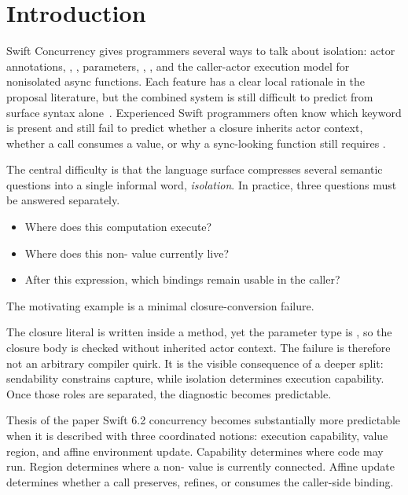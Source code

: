 \section{Introduction}
\label{sec:introduction}

Swift Concurrency gives programmers several ways to talk about isolation: actor annotations, , ,  parameters, , , and the caller-actor execution model for nonisolated async functions. Each feature has a clear local rationale in the proposal literature, but the combined system is still difficult to predict from surface syntax alone~\cite{se0313,se0414,se0420,se0430,se0431,se0461}. Experienced Swift programmers often know which keyword is present and still fail to predict whether a closure inherits actor context, whether a call consumes a value, or why a sync-looking function still requires .

The central difficulty is that the language surface compresses several semantic questions into a single informal word, \emph{isolation}. In practice, three questions must be answered separately.

\begin{itemize}
  \item Where does this computation execute?
  \item Where does this non- value currently live?
  \item After this expression, which bindings remain usable in the caller?
\end{itemize}

The motivating example is a minimal closure-conversion failure.


The closure literal is written inside a  method, yet the parameter type is , so the closure body is checked without inherited actor context. The failure is therefore not an arbitrary compiler quirk. It is the visible consequence of a deeper split: sendability constrains capture, while isolation determines execution capability. Once those roles are separated, the diagnostic becomes predictable.

\begin{propositionbox}{Thesis of the paper}
Swift 6.2 concurrency becomes substantially more predictable when it is described with three coordinated notions: execution capability, value region, and affine environment update. Capability determines where code may run. Region determines where a non- value is currently connected. Affine update determines whether a call preserves, refines, or consumes the caller-side binding.
\end{propositionbox}

